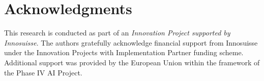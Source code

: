 \section*{Acknowledgments}

This research is conducted as part of an \textit{Innovation Project supported by Innosuisse}. The authors gratefully acknowledge financial support from Innosuisse under the Innovation Projects with Implementation Partner funding scheme. Additional support was provided by the European Union within the framework of the Phase IV AI Project.